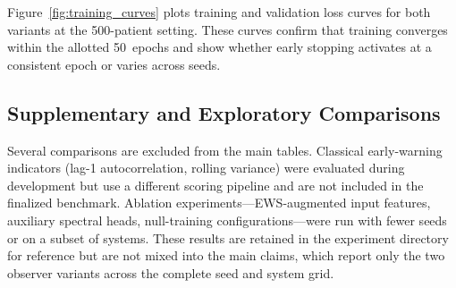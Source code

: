 Figure~\ref{fig:training_curves} plots training and validation loss curves for
both variants at the 500-patient setting. These curves confirm that training
converges within the allotted 50~epochs and show whether early stopping
activates at a consistent epoch or varies across seeds.

\subsection{Supplementary and Exploratory Comparisons}
\label{sec:design:supplementary}

Several comparisons are excluded from the main tables. Classical early-warning
indicators (lag-1 autocorrelation, rolling variance) were evaluated during
development but use a different scoring pipeline and are not included in the
finalized benchmark. Ablation experiments---EWS-augmented input features,
auxiliary spectral heads, null-training configurations---were run with fewer
seeds or on a subset of systems. These results are retained in the experiment
directory for reference but are not mixed into the main claims, which report
only the two observer variants across the complete seed and system grid.
